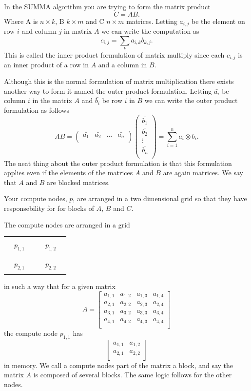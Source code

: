\documentclass{article}
\begin{document}
In the SUMMA algorithm you are trying to form the matrix product
\[
C = AB.
\]
Where A is $n \times k$, B $k \times m$ and C $n \times m$ matrices.
Letting $a_{i,j}$ be the element on row $i$ and column $j$ in matrix $A$
we can write the computation as
\[
c_{i,j} = \sum_k a_{i,k} b_{k,j}.
\]
This is called the inner product formulation of matrix multiply since each $c_{i,j}$ is
an inner product of a row in $A$ and a column in $B$.

Although this is the normal formulation of matrix multiplication there exists another way to
form it named the outer product formulation.
Letting $\bar{a_i}$ be column $i$ in the matrix $A$ and $\bar{b_i}$ be row $i$ in $B$ we can write
the outer product formulation as follows
\[
AB = \begin{pmatrix}
	\bar{a_1} & \bar{a_2} & \dots & \bar{a_n}\\
     \end{pmatrix}
     \begin{pmatrix}
	\bar{b_1}\\
	\bar{b_2}\\
	\vdots\\
	\bar{b_n}\\
     \end{pmatrix}
     =\sum_{i=1}^n a_i \otimes b_i.
\]
The neat thing about the outer product formulation is that this formulation applies even if the
elements of the matrices $A$ and $B$ are again matrices. We say that $A$ and $B$ are blocked
matrices.

Your compute nodes, $p$, are arranged in a two dimensional grid so that they have responsebility for
for blocks of $A$, $B$ and $C$.

The compute nodes are arranged in a grid
\begin{center}
\begin{tabular}{| c c c | c c c |}
\hline
&&&&&\\
&$p_{1,1}$ &&& $p_{1,2}$&\\
&&&&&\\
\hline
&&&&&\\
&$p_{2,1}$ &&& $p_{2,2}$&\\
&&&&&\\
\hline
\end{tabular}
\end{center}

in such a way that for a given matrix
\[
A=\begin{bmatrix}
a_{1,1} & a_{1,2} & a_{1,3} & a_{1,4} \\
a_{2,1} & a_{2,2} & a_{2,3} & a_{2,4} \\
a_{3,1} & a_{3,2} & a_{3,3} & a_{3,4} \\
a_{4,1} & a_{4,2} & a_{4,3} & a_{4,4} \\
\end{bmatrix}
\]
the compute node $p_{1,1}$ has
\[
\begin{bmatrix}
a_{1,1} & a_{1,2} \\
a_{2,1} & a_{2,2} \\
\end{bmatrix}
\]
in memory. We call a compute nodes part of the matrix a block, and say the matrix $A$ is composed of several blocks. The same logic follows for the other nodes.
\end{document}
